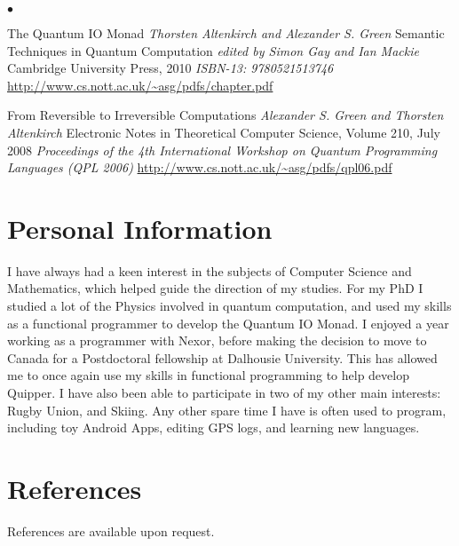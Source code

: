 \documentclass[line]{res}
\newenvironment{list2}{
  \begin{list}{$\bullet$}{%
      \setlength{\itemsep}{0in}
      \setlength{\parsep}{0.045in} \setlength{\parskip}{0in}
      \setlength{\topsep}{0in} \setlength{\partopsep}{0in}
      \setlength{\leftmargin}{0.2in}}}{\end{list}}
\begin{document}
\begin{resume}
\begin{list2}
\item The Quantum IO Monad
\emph{Thorsten Altenkirch and Alexander S. Green}
Semantic Techniques in Quantum Computation 
\emph{edited by Simon Gay and Ian Mackie}
Cambridge University Press, 2010
\emph{ISBN-13: 9780521513746}
\url{http://www.cs.nott.ac.uk/~asg/pdfs/chapter.pdf}

\item From Reversible to Irreversible Computations 
\emph{Alexander S. Green and Thorsten Altenkirch}
Electronic Notes in Theoretical Computer Science, Volume 210, July
2008
\emph{Proceedings of the 4th International Workshop on Quantum
  Programming Languages (QPL 2006)} 
\url{http://www.cs.nott.ac.uk/~asg/pdfs/qpl06.pdf}
\end{list2}

\vspace{-4mm}
\section{\sc Personal Information}
I have always had a keen interest in the subjects of Computer Science
and Mathematics, which helped guide the direction of my studies. For
my PhD I studied a lot of the Physics involved in quantum 
computation, and used my skills as a functional programmer to develop
the Quantum IO Monad. I enjoyed a year working as a
programmer with Nexor, before making the decision to move to Canada
for a Postdoctoral fellowship at Dalhousie University. This has
allowed me to once again use my skills in functional programming to
help develop Quipper. I have also been able to participate in two of my
other main interests: Rugby Union, and Skiing. Any other spare time I
have is often used to program, including toy Android Apps, 
editing GPS logs, and learning new languages.

\vspace{-4mm}
\section{\sc References}
References are available upon request.

\end{resume}
\end{document}
